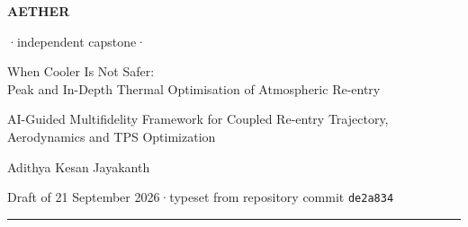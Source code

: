 \thispagestyle{plain}
\enlargethispage{2\baselineskip}
\noindent
{\sffamily\bfseries\fontsize{9}{11}\selectfont\color{accent}AETHER}%
{\sffamily\fontsize{9}{11}\selectfont\color{inktwo}\;·\;independent capstone\;·\par}
\vspace{6pt}
{\sffamily\bfseries\fontsize{22}{26}\selectfont\color{ink}\raggedright
When Cooler Is Not Safer:\\
Peak and In-Depth Thermal Optimisation of Atmospheric Re-entry\par}
\vspace{7pt}
{\rmfamily\itshape\fontsize{12.5}{16}\selectfont\color{inktwo}\raggedright
AI-Guided Multifidelity Framework for Coupled Re-entry Trajectory, Aerodynamics and TPS Optimization\par}
\vspace{11pt}
{\sffamily\fontsize{11.5}{14}\selectfont\color{ink}Adithya Kesan Jayakanth\par}
\vspace{3pt}
{\sffamily\fontsize{9}{11}\selectfont\color{inktwo}Draft of 21 September 2026\;·\;typeset from repository commit \texttt{de2a834}\par}
\vspace{7pt}
{\color{ruleline}\rule{\linewidth}{0.6pt}\par}
\vspace{2pt}
